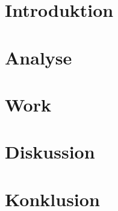 
\usepackage[disable]{todonotes}					%
\usepackage[draft]{fixme}


	
	\clearpage
	\newpage\null\thispagestyle{empty}
	
	\addtocounter{page}{4}
	
	\newpage\null\thispagestyle{empty}\newpage
	\label{startoftoc}
	\begin{KeepFromToc}
		\tableofcontents
		\newpage\null\thispagestyle{empty}\newpage
		\todototoc
		\listoftodos
	\end{KeepFromToc}
	\label{endoftoc}
	
	\chapter{Introduktion}
	
	
	\chapter{Analyse}
	
	
	
	\chapter{Work}
	
	
	\chapter{Diskussion}
	\chapter{Konklusion}
	
	
	
	\label{lastpagewithoutappendix}

	\appendix
	\cleardoublepage

